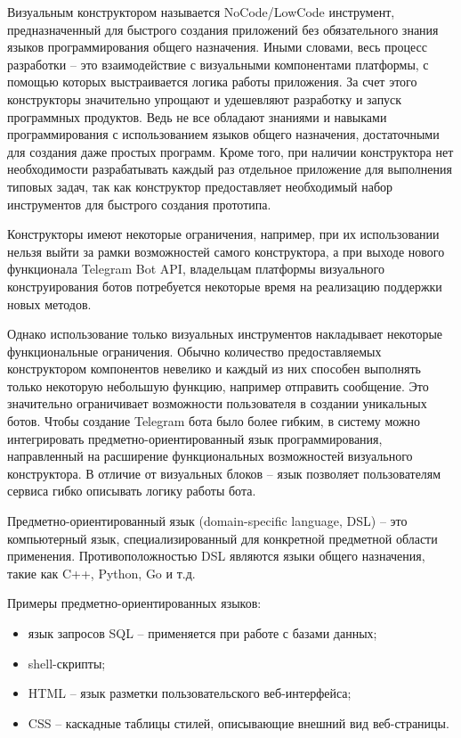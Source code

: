 Визуальным конструктором называется NoCode/LowCode инструмент,
предназначенный для быстрого создания приложений без обязательного знания языков программирования общего назначения.
Иными словами, весь процесс разработки -- это взаимодействие с визуальными компонентами платформы,
с помощью которых выстраивается логика работы приложения.
За счет этого конструкторы значительно упрощают и удешевляют разработку и запуск программных продуктов.
Ведь не все обладают знаниями и навыками программирования с использованием языков общего назначения, достаточными для создания даже простых программ.
Кроме того, при наличии конструктора нет необходимости разрабатывать каждый раз отдельное приложение для выполнения типовых задач,
так как конструктор предоставляет необходимый набор инструментов для быстрого создания прототипа.

Конструкторы имеют некоторые ограничения, например, при их использовании нельзя выйти за рамки возможностей самого конструктора,
а при выходе нового функционала Telegram Bot API,
владельцам платформы визуального конструирования ботов потребуется некоторые время на реализацию поддержки новых методов.

Однако использование только визуальных инструментов накладывает некоторые функциональные ограничения.
Обычно количество предоставляемых конструктором компонентов невелико и каждый из них способен выполнять только некоторую небольшую функцию, например отправить сообщение.
Это значительно ограничивает возможности пользователя в создании уникальных ботов.
Чтобы создание Telegram бота было более гибким, в систему можно интегрировать предметно-ориентированный язык программирования,
направленный на расширение функциональных возможностей визуального конструктора.
В отличие от визуальных блоков – язык позволяет пользователям сервиса гибко описывать логику работы бота.

Предметно-ориентированный язык (domain-specific language, DSL) -- это компьютерный язык, специализированный для конкретной предметной области применения.
Противоположностью DSL являются языки общего назначения, такие как C++, Python, Go и т.д.

Примеры предметно-ориентированных языков:
\begin{itemize}
    \item язык запросов SQL -- применяется при работе с базами данных;
    \item shell-скрипты;
    \item HTML -- язык разметки пользовательского веб-интерфейса;
    \item CSS -- каскадные таблицы стилей, описывающие внешний вид веб-страницы.
\end{itemize}

